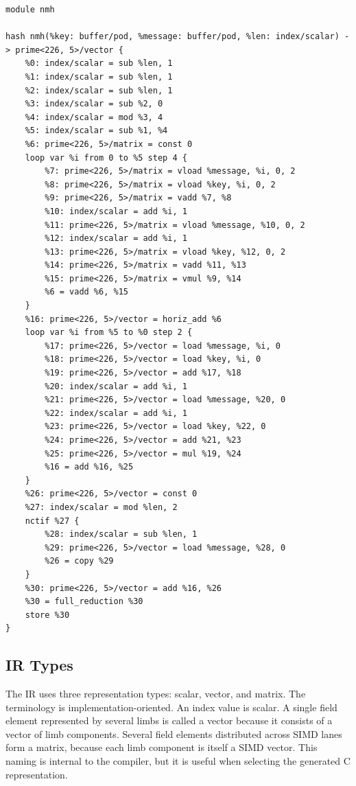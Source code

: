 \begin{lstlisting}[style=thesisIR,caption={Pretty-printed IR for vectorized NMH in \(GF(2^{226}-5)\) with schoolbook multiplication, fully delayed limb realignment, and unrolling factor one.},label={lst:nmh-ir}]
module nmh

hash nmh(%key: buffer/pod, %message: buffer/pod, %len: index/scalar) -> prime<226, 5>/vector {
    %0: index/scalar = sub %len, 1
    %1: index/scalar = sub %len, 1
    %2: index/scalar = sub %len, 1
    %3: index/scalar = sub %2, 0
    %4: index/scalar = mod %3, 4
    %5: index/scalar = sub %1, %4
    %6: prime<226, 5>/matrix = const 0
    loop var %i from 0 to %5 step 4 {
        %7: prime<226, 5>/matrix = vload %message, %i, 0, 2
        %8: prime<226, 5>/matrix = vload %key, %i, 0, 2
        %9: prime<226, 5>/matrix = vadd %7, %8
        %10: index/scalar = add %i, 1
        %11: prime<226, 5>/matrix = vload %message, %10, 0, 2
        %12: index/scalar = add %i, 1
        %13: prime<226, 5>/matrix = vload %key, %12, 0, 2
        %14: prime<226, 5>/matrix = vadd %11, %13
        %15: prime<226, 5>/matrix = vmul %9, %14
        %6 = vadd %6, %15
    }
    %16: prime<226, 5>/vector = horiz_add %6
    loop var %i from %5 to %0 step 2 {
        %17: prime<226, 5>/vector = load %message, %i, 0
        %18: prime<226, 5>/vector = load %key, %i, 0
        %19: prime<226, 5>/vector = add %17, %18
        %20: index/scalar = add %i, 1
        %21: prime<226, 5>/vector = load %message, %20, 0
        %22: index/scalar = add %i, 1
        %23: prime<226, 5>/vector = load %key, %22, 0
        %24: prime<226, 5>/vector = add %21, %23
        %25: prime<226, 5>/vector = mul %19, %24
        %16 = add %16, %25
    }
    %26: prime<226, 5>/vector = const 0
    %27: index/scalar = mod %len, 2
    nctif %27 {
        %28: index/scalar = sub %len, 1
        %29: prime<226, 5>/vector = load %message, %28, 0
        %26 = copy %29
    }
    %30: prime<226, 5>/vector = add %16, %26
    %30 = full_reduction %30
    store %30
}
\end{lstlisting}

\subsection{IR Types}
\label{subsec:ir-types}

The IR uses three representation types: scalar, vector, and matrix. The terminology is implementation-oriented. An index value is scalar. A single field element represented by several limbs is called a vector because it consists of a vector of limb components. Several field elements distributed across SIMD lanes form a matrix, because each limb component is itself a SIMD vector. This naming is internal to the compiler, but it is useful when selecting the generated C representation.

